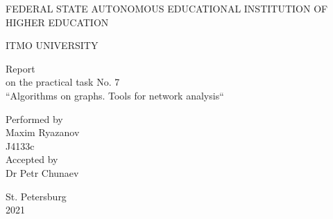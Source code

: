 \documentclass[12pt,a4paper]{report}
\begin{document}
	\vspace*{15ex}
	\begin{center}
		FEDERAL STATE AUTONOMOUS EDUCATIONAL INSTITUTION OF HIGHER EDUCATION 
		
		ITMO UNIVERSITY
		\vspace*{30ex}
		
		Report\\
		on the practical task No. 7\\
		``Algorithms on graphs. Tools for network analysis``
	\end{center}
	\vspace{25ex}
	\begin{flushright}
		Performed by\\
		Maxim Ryazanov\\
		J4133c\\
		Accepted by\\
		Dr Petr Chunaev
	\end{flushright}
	\vspace{20ex}
	\begin{center}
		St. Petersburg\\
		2021
	\end{center}
	\newpage

    
	
	
	
	
\end{document}
